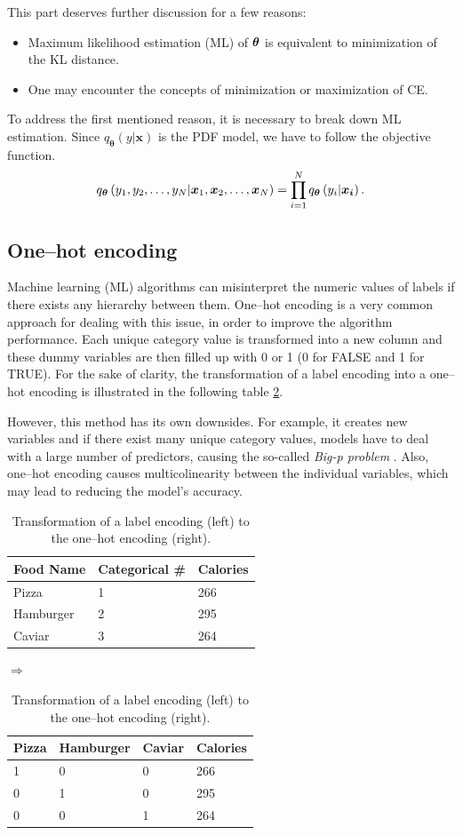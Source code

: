 This part deserves further discussion for a few reasons:
\begin{itemize}
    \item Maximum likelihood estimation (ML) of $\boldsymbol{\theta}$ is equivalent to minimization of the KL distance.
    \item One may encounter the concepts of minimization or maximization of CE.
\end{itemize}
To address the first mentioned reason, it is necessary to break down ML estimation. Since $q_{\boldsymbol{\theta}}\left(y|\boldsymbol{x}\right)$ is the PDF model, we have to follow the objective function.
\begin{equation}
    q_{\boldsymbol{\theta}}\left(y_1,y_2,\dots,y_N|\boldsymbol{x}_1, \boldsymbol{x}_2, \dots, \boldsymbol{x}_N\right) = \prod_{i=1}^{N}q_{\boldsymbol{\theta}}\left(y_i|\boldsymbol{x_i}\right).
\end{equation}


\subsection{One--hot encoding}\label{OHE}
 Machine learning (ML) algorithms can misinterpret the numeric values of labels if there exists any hierarchy between them. One--hot encoding is a very common approach for dealing with this issue, in order to improve the algorithm performance. Each unique category value is transformed into a new column and these dummy variables are then filled up with 0 or 1 (0 for FALSE and 1 for TRUE). For the sake of clarity, the transformation of a label encoding into a one--hot encoding is illustrated in the following table \ref{tab:OHE}. 
 
 However, this method has its own downsides. For example, it creates new variables and if there exist many unique category values, models have to deal with a large number of predictors, causing the so-called \emph{Big-p problem} \cite{Bigp}. Also, one--hot encoding causes multicolinearity between the individual variables, which may lead to reducing the model's accuracy. 
 \begin{table}[h]
 \centering
 	\begin{tabular}{|l|l|l|}
 		\hline
 		Food Name & Categorical \# & Calories \\ \hline
 		Pizza     & 1              & 266      \\ \hline
 		Hamburger & 2              & 295      \\ \hline
 		Caviar    & 3              & 264      \\ \hline
 	\end{tabular}
 	\quad $\Rightarrow$ \quad
	\begin{tabular}{|l|l|l|l|}
		\hline
		Pizza & Hamburger & Caviar & Calories \\ \hline
		1     & 0         & 0      & 266      \\ \hline
		0     & 1         & 0      & 295      \\ \hline
		0     & 0         & 1      & 264      \\ \hline
	\end{tabular}
	\caption{Transformation of a label encoding (left) to the one--hot encoding (right).}
	\label{tab:OHE}
 \end{table}

